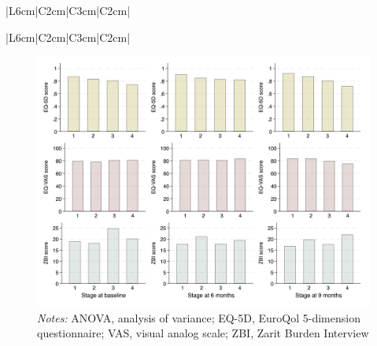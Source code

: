 \documentclass[12pt]{article}
\begin{document}
\begin{table}[H]
    \centering \singlespacing \small
    \caption{Univariable OLS regression models of associations, with ZBI as dependent variable, used in selection of independent variables for multivariable regression}
    \begin{tabular}{|L{6cm}|C{2cm}|C{3cm}|C{2cm}|}
        \hline
    \end{tabular}
    \label{tab_univarReg_zbi}
    \caption*{\footnotesize 
                \textit{Notes:} ALSFRS-R, Revised Amyotrophic Lateral Sclerosis Functional Rating Scale; EQ-5D, EuroQol 5-dimension; HADS, Hospital Anxiety and Depression Scale; MQOL, McGill Quality of Life Questionnaire; ZBI, Zarit Burden Interview}
\end{table}



\begin{table}[H]
    \centering \singlespacing \small
    \caption{Univariable OLS regression models of associations, with EQ-5D as dependent variable, used in selection of independent variables for multivariable regression}
    \begin{tabular}{|L{6cm}|C{2cm}|C{3cm}|C{2cm}|}
        \hline
    \end{tabular}
    \label{tab_univarReg_eq5d}
    \caption*{\footnotesize 
                \textit{Notes:} ALSFRS-R, Revised Amyotrophic Lateral Sclerosis Functional Rating Scale; EQ-5D, EuroQol 5-dimension; HADS, Hospital Anxiety and Depression Scale; MQOL, McGill Quality of Life Questionnaire; ZBI, Zarit Burden Interview}
\end{table}


\begin{figure}[H]
    \centering
    \includegraphics[width=1\linewidth]{figures/outcome-kings-stage.png}
    \caption{EQ-5D-5L utility scores, domain scores and scores by King’s stage}
    \label{fig:outcome-kings-stage}
    \caption*{\footnotesize \textit{Notes:} ANOVA, analysis of variance; EQ-5D, EuroQol 5-dimension questionnaire; VAS, visual analog scale; ZBI, Zarit Burden Interview}
\end{figure}
\end{document}
